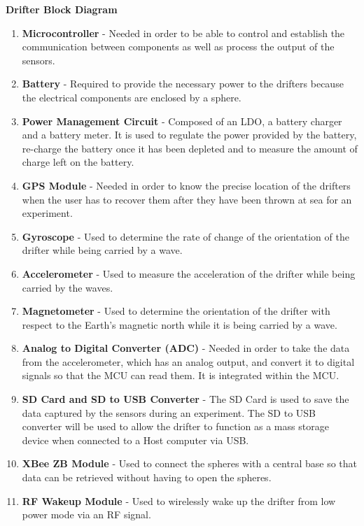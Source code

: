 \noindent\textbf{Drifter Block Diagram}
\begin{enumerate}
\item \textbf{Microcontroller} -  Needed in order to be able to control and establish the communication between components as well as process the output of the sensors.

\item \textbf{Battery} - Required to provide the necessary power to the drifters because the electrical components are enclosed by a sphere.

\item \textbf{Power Management Circuit} - Composed of an LDO, a battery charger and a battery meter.  It is used to regulate the power provided by the battery, re-charge the battery once it has been depleted and to measure the amount of charge left on the battery.

\item \textbf{GPS Module} - Needed in order to know the precise location of the drifters when the user has to recover them after they have been thrown at sea for an experiment.

\item \textbf{Gyroscope} - Used to determine the rate of change of the orientation of the drifter while being carried by a wave.

\item \textbf{Accelerometer} - Used to measure the acceleration of the drifter while being carried by the waves.

\item \textbf{Magnetometer} - Used to determine the orientation of the drifter with respect to the Earth's magnetic north while it is being carried by a wave.

\item \textbf{Analog to Digital Converter (ADC)} - Needed in order to take the data from the accelerometer, which has an analog output, and convert it to digital signals so that the MCU can read them.  It is integrated within the MCU.

\item \textbf{SD Card and SD to USB Converter} - The SD Card is used to save the data captured by the sensors during an experiment.  The SD to USB converter will be used to allow the drifter to function as a mass storage device when connected to a Host computer via USB.

\item \textbf{XBee ZB Module} - Used to connect the spheres with a central base so that data can be retrieved without having to open the spheres.


\item \textbf{RF Wakeup Module} - Used to wirelessly wake up the drifter from low power mode via an RF signal.

\end{enumerate}

